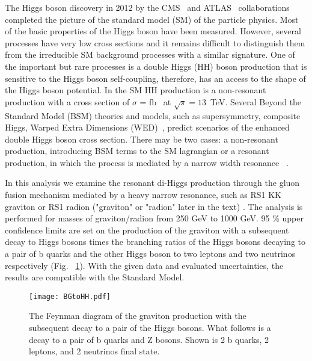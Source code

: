 The Higgs boson discovery in 2012 by the CMS~\cite{HiggsCMS} and
ATLAS~\cite{HiggsAtlas} collaborations completed the picture of the
standard model
(SM) \cite{Salam:1961en,Glashow:1961tr,Weinberg:1967tq}
of the particle physics. Most of the basic properties of the Higgs
boson have been measured. However, several processes have very low
cross sections and it remains difficult to distinguish them from the
irreducible SM background processes with a similar signature. One of
the important but rare processes is a double Higgs (HH) boson
production that is sensitive to the Higgs boson self-coupling, therefore, 
has an access to the shape of the Higgs boson potential. In the SM HH
production is a non-resonant production with a cross section of $\sigma$
=  fb~\cite{HHXsec} at $\sqrt{s}=13$~TeV. Several Beyond the Standard
Model (BSM) theories and models, such as supersymmetry, composite Higgs, Warped Extra Dimensions (WED)~\cite{Dolan:2012ac, Huang:2017nnw, Kanemura:2016tan, Oliveira:2014kla, WED}, predict scenarios of the enhanced double Higgs boson
cross section.
There may be two cases: a non-resonant production,
introducing BSM terms to the SM lagrangian or a resonant production,
in which the process is mediated by a narrow width resonance
~\cite{WED}. %
\vspace{1em} %

In this analysis we examine the resonant di-Higgs production
through the gluon fusion mechanism mediated by a heavy narrow
resonance, such as RS1 KK graviton or RS1 radion ("graviton" or "radion" later in the text) \cite{BG1,BG2,BG3}. The analysis is performed for
masses of graviton/radion from 250 GeV to 1000 GeV. 95 \% upper confidence
limits are set on the production of the graviton with a subsequent
decay to Higgs bosons times the branching ratios of the Higgs
bosons decaying to a pair of b quarks and the other Higgs boson to two
leptons and two neutrinos respectively (Fig. ~\ref{fig:BGtoHH}). With the given data and
evaluated uncertainties, the results are compatible with the Standard
Model.


\begin{figure}[!htb]%
  \begin{center}
    \texttt{[image: BGtoHH.pdf]}
    \caption{ The Feynman diagram of the graviton production with the subsequent decay to a pair of the Higgs bosons. What follows is a decay to a pair of b quarks and Z bosons. Shown is 2 b quarks, 2 leptons, and 2 neutrinos final state.
    }
    \label{fig:BGtoHH}
  \end{center}
\end{figure}


